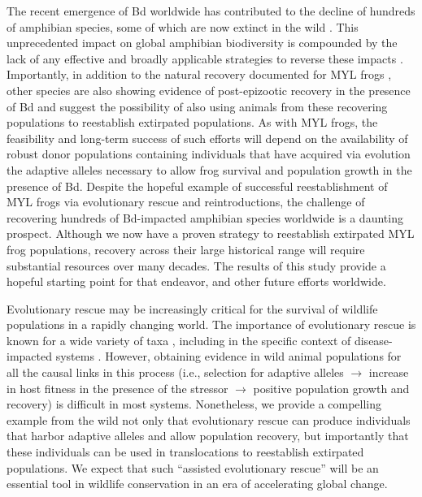 \documentclass[9pt,twocolumn,twoside,lineno]{pnas-new}
\begin{document}
The recent emergence of Bd worldwide has contributed to the decline of
hundreds of amphibian species, some of which are now extinct in the wild
\citep{scheele2019}. This unprecedented impact on global amphibian
biodiversity is compounded by the lack of any effective and broadly
applicable strategies to reverse these impacts
\citep{garner2016, knapp2022}. Importantly, in addition to the natural
recovery documented for MYL frogs \citep{knapp2016}, other species are
also showing evidence of post-epizootic recovery in the presence of Bd
\citep{scheele2017, voyles2018} and suggest the possibility of also
using animals from these recovering populations to reestablish
extirpated populations. As with MYL frogs, the feasibility and long-term
success of such efforts will depend on the availability of robust donor
populations containing individuals that have acquired via evolution the
adaptive alleles necessary to allow frog survival and population growth
in the presence of Bd. Despite the hopeful example of successful
reestablishment of MYL frogs via evolutionary rescue and
reintroductions, the challenge of recovering hundreds of Bd-impacted
amphibian species worldwide is a daunting prospect. Although we now have
a proven strategy to reestablish extirpated MYL frog populations,
recovery across their large historical range will require substantial
resources over many decades. The results of this study provide a hopeful
starting point for that endeavor, and other future efforts worldwide.

Evolutionary rescue may be increasingly critical for the survival of
wildlife populations in a rapidly changing world. The importance of
evolutionary rescue is known for a wide variety of taxa
\citep[e.g.,][]{carlson2014, mills2018, oziolor2019}, including in the
specific context of disease-impacted systems \citep{searle2020}.
However, obtaining evidence in wild animal populations for all the
causal links in this process (i.e., selection for adaptive alleles
\(\rightarrow\) increase in host fitness in the presence of the stressor
\(\rightarrow\) positive population growth and recovery) is difficult in
most systems. Nonetheless, we provide a compelling example from the wild
not only that evolutionary rescue can produce individuals that harbor
adaptive alleles and allow population recovery, but importantly that
these individuals can be used in translocations to reestablish
extirpated populations. We expect that such ``assisted evolutionary
rescue'' will be an essential tool in wildlife conservation in an era of
accelerating global change.
\end{document}
